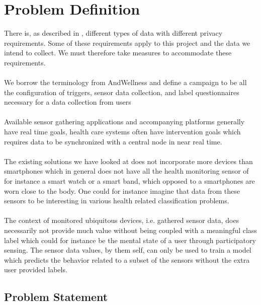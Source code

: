 
\section{Problem Definition} 
\label{sec:problem_definition}
There is, as described in , different types of data with different privacy requirements. Some of these requirements apply to this project and the data we intend to collect. We must therefore take measures to accommodate these requirements. 
\\\\
We borrow the terminology from AndWellness \parencite{hicks2010andwellness} and define a campaign to be all the configuration of triggers, sensor data collection, and label questionnaires necessary for a data collection from users    
\\\\
Available sensor gathering applications and accompanying platforms generally have real time goals, health care systems often have intervention goals which requires data to be synchronized with a central node in near real time. 
\\\\
The existing solutions we have looked at does not incorporate more devices than smartphones which in general does not have all the health monitoring sensor of for instance a smart watch or a smart band, which opposed to a smartphones are worn close to the body. One could for instance imagine that data from these sensors to be interesting in various health related classification problems. 
\\\\
The context of monitored ubiquitous devices, i.e. gathered sensor data, does necessarily not provide much value without being coupled with a meaningful class label which could for instance be the mental state of a user through participatory sensing. The sensor data values, by them self, can only be used to train a model which predicts the behavior related to a subset of the sensors without the extra user provided labels.

\subsection{Problem Statement}
\label{sub:problem_statement}

